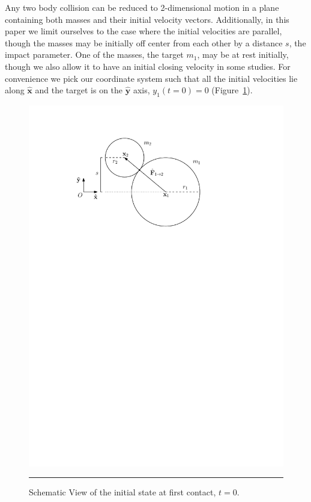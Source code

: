 \documentclass[aps,prl,floatfix,preprint,nofootinbib]{revtex4}
\begin{document}
Any two body collision can be reduced to 2-dimensional motion in a plane containing both masses and their initial velocity vectors. Additionally, in this paper we limit ourselves to the case where the initial velocities are parallel, though the masses may be initially off center from each other by a distance $s$, the impact parameter. One of the masses, the target $m_{1}$, may be at rest initially, though we also allow it to have an initial closing velocity in some studies. For convenience we pick our coordinate system such that all the initial velocities lie along $\hat{\mathbf{x}}$ and the target is on the $\hat{\mathbf{y}}$ axis, $y_{1}(t=0)=0$ (Figure~\ref{fig:schematic}).

\begin{figure}[htbc]
  \centering
  \includegraphics[width=.70\textwidth]{plots/cj_diag.pdf}
	          {\par\nobreak\rule[9pt]{35em}{0.5pt}\vspace{-5mm}}
	          \caption{Schematic View of the initial state at first contact, $t = 0$.}
	          \label{fig:schematic}
\end{figure}
\end{document}

